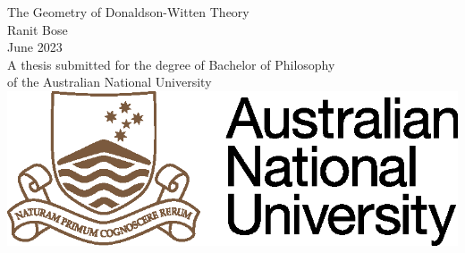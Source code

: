 \begin{titlepage}
\begin{center}

\vspace*{\fill} \Huge
                        The Geometry of Donaldson-Witten Theory
\\
\vfill\vfill\Large
                          Ranit Bose
\\
\vfill\vfill
                          June 2023
\\
\vfill\vfill \normalsize
         A thesis submitted for the degree of Bachelor of Philosophy\\
         of the Australian National University
\vfill
         \includegraphics{ANU.eps}

\end{center}

\end{titlepage}
